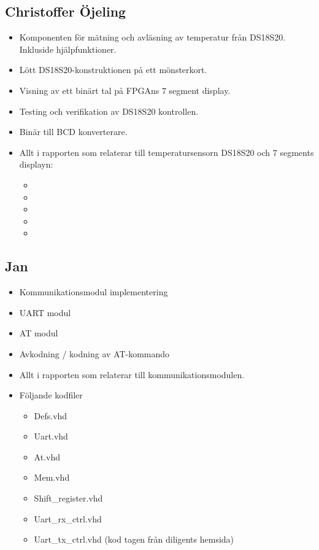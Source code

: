 \documentclass[a4paper]{scrartcl}
\begin{document}
\subsection{Christoffer Öjeling}
\begin{itemize}
	\item Komponenten för mätning och avläsning av temperatur från DS18S20. Inkluside hjälpfunktioner.
	\item Lött DS18S20-konstruktionen på ett mönsterkort.
	\item Visning av ett binärt tal på FPGAns 7 segment display.
	\item Testing och verifikation av DS18S20 kontrollen.
	\item Binär till BCD konverterare.
	\item Allt i rapporten som relaterar till temperatursensorn DS18S20 och 7 segments displayn:
		\begin{itemize}
		\item {}
		\item {}
		\item {}
		\item {}
		\item {}
		\end{itemize}
\end{itemize}

\subsection{Jan}
\begin{itemize}
	\item Kommunikationsmodul implementering
	\item UART modul
	\item AT modul
	\item Avkodning / kodning av AT-kommando
	\item Allt i rapporten som relaterar till kommunikationsmodulen.
	\item Följande kodfiler
		\begin{itemize}
		\item Defs.vhd
		\item Uart.vhd
		\item At.vhd
		\item Mem.vhd
		\item Shift\_register.vhd
		\item Uart\_rx\_ctrl.vhd
		\item Uart\_tx\_ctrl.vhd (kod tagen från diligents hemsida)
		\end{itemize}
\end{itemize}
\end{document}
